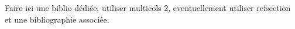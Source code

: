 Faire ici une biblio dédiée, utiliser multicols 2, eventuellement utiliser refsection et une bibliographie associée.